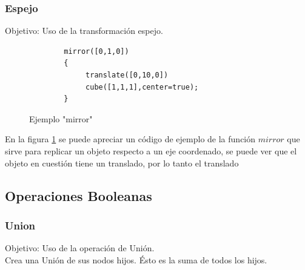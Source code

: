 \documentclass{article}
\begin{document}
\subsubsection{Espejo}

Objetivo: Uso de la transformación espejo.\citep{OpenSCS}\\

\begin{figure}
    \centering
    \begin{verbatim}
        mirror([0,1,0])
        {
             translate([0,10,0])
             cube([1,1,1],center=true);
        }
    \end{verbatim}
    \caption{Ejemplo "mirror"}
    \label{fig:mirr}
\end{figure}
En la figura \ref{fig:mirr} se puede apreciar un código de ejemplo de la función $mirror$ que sirve para replicar un objeto respecto a un eje coordenado, se puede ver que el objeto en cuestión tiene un translado, por lo tanto el translado






\citep{OpenSCS}

\subsection{Operaciones Booleanas}

\subsubsection{Union}

Objetivo: Uso de la operación de Unión.\citep{OpenSCS}\\


Crea una Unión de sus nodos hijos. Ésto es la suma de todos los hijos.\citep{WikiOpensCAD}\\
\end{document}
